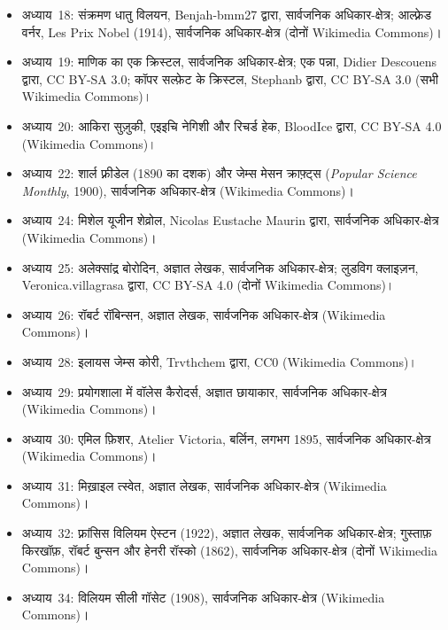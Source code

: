 \begin{itemize}
        (Wikimedia Commons)।
  \item अध्याय~18: संक्रमण धातु विलयन, Benjah-bmm27 द्वारा, सार्वजनिक अधिकार-क्षेत्र; आल्फ़्रेड
        वर्नर, Les Prix Nobel (1914), सार्वजनिक अधिकार-क्षेत्र (दोनों Wikimedia Commons)।
  \item अध्याय~19: माणिक का एक क्रिस्टल, सार्वजनिक अधिकार-क्षेत्र; एक पन्ना, Didier Descouens द्वारा,
        CC BY-SA 3.0; कॉपर सल्फ़ेट के क्रिस्टल, Stephanb द्वारा, CC BY-SA 3.0 (सभी
        Wikimedia Commons)।
  \item अध्याय~20: आकिरा सुज़ुकी, एइइचि नेगिशी और रिचर्ड हेक, BloodIce द्वारा, CC BY-SA
        4.0 (Wikimedia Commons)।
  \item अध्याय~22: शार्ल फ़्रीडेल (1890 का दशक) और जेम्स मेसन क्राफ़्ट्स (\textit{Popular
        Science Monthly}, 1900), सार्वजनिक अधिकार-क्षेत्र (Wikimedia Commons)।
  \item अध्याय~24: मिशेल यूजीन शेव्रोल, Nicolas Eustache Maurin द्वारा, सार्वजनिक अधिकार-क्षेत्र
        (Wikimedia Commons)।
  \item अध्याय~25: अलेक्सांद्र बोरोदिन, अज्ञात लेखक, सार्वजनिक अधिकार-क्षेत्र; लुडविग क्लाइज़न,
        Veronica.villagrasa द्वारा, CC BY-SA 4.0 (दोनों Wikimedia Commons)।
  \item अध्याय~26: रॉबर्ट रॉबिन्सन, अज्ञात लेखक, सार्वजनिक अधिकार-क्षेत्र (Wikimedia Commons)।
  \item अध्याय~28: इलायस जेम्स कोरी, Trvthchem द्वारा, CC0 (Wikimedia Commons)।
  \item अध्याय~29: प्रयोगशाला में वॉलेस कैरोदर्स, अज्ञात छायाकार, सार्वजनिक अधिकार-क्षेत्र
        (Wikimedia Commons)।
  \item अध्याय~30: एमिल फ़िशर, Atelier Victoria, बर्लिन, लगभग 1895, सार्वजनिक अधिकार-क्षेत्र (Wikimedia
        Commons)।
  \item अध्याय~31: मिख़ाइल त्स्वेत, अज्ञात लेखक, सार्वजनिक अधिकार-क्षेत्र (Wikimedia Commons)।
  \item अध्याय~32: फ़्रांसिस विलियम ऐस्टन (1922), अज्ञात लेखक, सार्वजनिक अधिकार-क्षेत्र; गुस्ताफ़ किरखॉफ़,
        रॉबर्ट बुन्सन और हेनरी रॉस्को (1862), सार्वजनिक अधिकार-क्षेत्र (दोनों Wikimedia Commons)।
  \item अध्याय~34: विलियम सीली गॉसेट (1908), सार्वजनिक अधिकार-क्षेत्र (Wikimedia Commons)।
\end{itemize}
\clearpage
